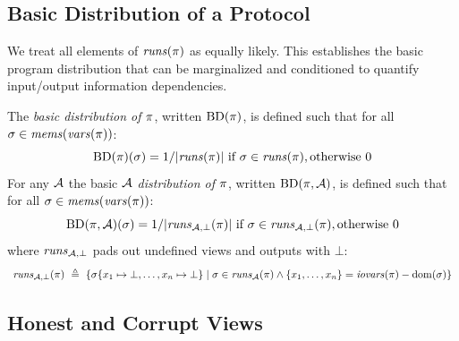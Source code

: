 \subsection{Basic Distribution of a Protocol}

We treat all elements of $\mathit{runs}(\pi)$ as equally likely.  This
establishes the basic program distribution that can be marginalized
and conditioned to quantify input/output information dependencies.
\begin{definition}
  \label{def-progtt}
  \label{def-progd}
  \label{definition-progd}
  The \emph{basic distribution of $\pi$}, written $\mathrm{BD}(\pi)$, is
  defined such that for all $\sigma \in \mathit{mems}(\mathit{vars}(\pi))$:
  $$
  \mathrm{BD}(\pi)(\sigma) =  1 / |\mathit{runs}(\pi)| \ \text{if}\ \sigma \in \mathit{runs}(\pi), \text{otherwise}\ 0
  $$
  For any $\mathcal{A}$ the basic \emph{$\mathcal{A}$ distribution of $\pi$}, written
  $\mathrm{BD}(\pi,\mathcal{A})$, is
  defined such that for all $\sigma \in \mathit{mems}(\mathit{vars}(\pi))$:
  $$
  \mathrm{BD}(\pi,\mathcal{A})(\sigma) =  1 / |\mathit{runs}_{\mathcal{A},\bot}(\pi)| \ \text{if}\ \sigma \in \mathit{runs}_{\mathcal{A},\bot}(\pi), \text{otherwise}\ 0
  $$
  where $\mathit{runs}_{\mathcal{A},\bot}$ pads out undefined views and outputs with $\bot$:
  $$
  \begin{array}{c}
    \botruns(\prog)\ \defeq\ %
    \{ \store\{ x_1 \mapsto \bot, \ldots, x_n \mapsto \bot \} \mid 
    \store \in \aruns(\prog) \wedge \{ x_1,\ldots,x_n\} = \iov(\prog) - \dom(\store) \}
  \end{array}
  $$
\end{definition}


\subsection{Honest and Corrupt Views}

